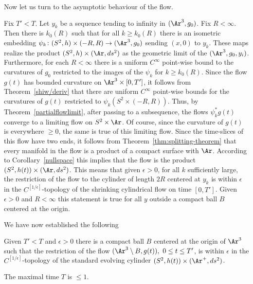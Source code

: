 Now let us turn to the asymptotic behaviour of the flow.


Fix $T'<T$. Let $y_k$ be a sequence tending to infinity in
$(\Ar^3,g_0)$. Fix $R<\infty$. Then there is $k_0(R)$ such that for
all $k\ge k_0(R)$ there is an isometric embedding $\psi_k\colon
(S^2,h)\times (-R,R)\to (\Ar^3,g_0)$ sending $(x,0)$ to $y_k$. These
maps realize the product $(S^2,h)\times (\Ar,ds^2)$ as the geometric
limit of the $(\Ar^3,g_0,y_i)$. Furthermore, for each $R<\infty$
there is a uniform $C^\infty$ point-wise bound to the curvatures of
$g_0$ restricted to the images of the $\psi_k$ for $k\ge k_0(R)$.
 Since the flow $g(t)$ has bounded
curvature on $\Ar^3\times [0,T']$, it follows from
Theorem~\ref{shiw/deriv} that there are uniform $C^\infty$
point-wise bounds for the curvatures of $g(t)$ restricted to
$\psi_k(S^2\times (-R,R))$. Thus,
 by Theorem~\ref{partialflowlimit}, after passing to a subsequence, the flows
$\psi_k^*g(t)$ converge to a  limiting flow on $S^2\times \Ar$. Of
course, since the curvature of $g(t)$ is everywhere $\ge 0$, the
same is true of this limiting flow. Since the time-slices of this
flow have two ends, it follows from Theorem~\ref{thm:splitting-theorem} that
every manifold in the flow is a product of a compact surface with
$\Ar$. According to Corollary~\ref{nullspace} this implies that the
flow is the product $(S^2,h(t))\times (\Ar,ds^2)$. This means that
given $\epsilon>0$, for all $k$ sufficiently large, the restriction
of the flow to the cylinder of length $2R$ centered at $y_k$  is
within $\epsilon$ in the $C^{[1/\epsilon]}$-topology of the
shrinking cylindrical flow on time $[0,T']$. Given $\epsilon>0$ and
$R<\infty$ this statement is true for all $y$ outside a compact ball
$B$ centered at the origin.

We have now established the following

\begin{proposition}
\label{prop:standard-flow-asymptotic-cylinder}
\label{item5}
Given $T'<T$ and $\epsilon>0$ there is a compact ball $B$ centered
at the origin of $\Ar^3$ such that the restriction of the flow
$(\Ar^3\setminus B,g(t)),\ 0\le t\le T'$, is within $\epsilon$ in
the $C^{[1/\epsilon]}$-topology of the standard evolving cylinder
$(S^2,h(t))\times (\Ar^+,ds^2)$.
\end{proposition}

\begin{corollary}
\label{cor:standard-flow-time-bound-one}
\label{1}
The maximal time $T$ is $\le 1$.
\end{corollary}

